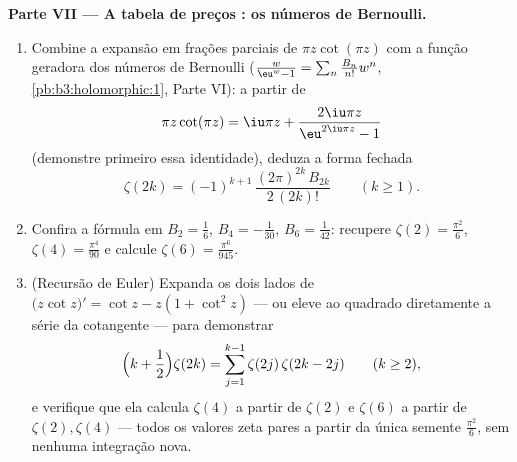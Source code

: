 \begin{problem}
\begin{enumerate}[resume]
\end{enumerate}
\medskip
\noindent\textbf{Parte VII --- A tabela de preços : os números
de Bernoulli.}
\begin{enumerate}[resume]
  \item Combine a expansão em frações parciais de $\pi
        z\cot(\pi z)$ com a função
        geradora dos números de Bernoulli ($\frac{w}{\eu^w - 1} =
        \sum_n\frac{B_n}{n!}w^n$, \cref{pb:b3:holomorphic:1}, Parte
        VI): a partir de
        \[
        \pi z\cot(\pi z) = \iu\pi z +
        \frac{2\iu\pi z}{\eu^{2\iu\pi z} - 1}
        \]
        (demonstre primeiro essa identidade), deduza a forma fechada
        \[
        \zeta(2k) = (-1)^{k+1}\,
        \frac{(2\pi)^{2k}\,B_{2k}}{2\,(2k)!}
        \qquad (k \geq 1).
        \]
  \item Confira a fórmula em $B_2 = \frac16$, $B_4 =
        -\frac1{30}$, $B_6 = \frac1{42}$: recupere $\zeta(2) =
        \frac{\pi^2}6$, $\zeta(4) = \frac{\pi^4}{90}$ e
        calcule $\zeta(6) = \frac{\pi^6}{945}$.
  \item (Recursão de Euler) Expanda os dois lados de $\bigl(z\cot z\bigr)' = \cot z - z(1 + \cot^2z)$ --- ou eleve
        ao quadrado diretamente a série da cotangente --- para
        demonstrar
        \[
        \Bigl(k + \frac12\Bigr)\zeta(2k) =
        \sum_{j=1}^{k-1}\zeta(2j)\,\zeta(2k - 2j)
        \qquad (k \geq 2),
        \]
        e verifique que ela calcula $\zeta(4)$ a partir de $\zeta(2)$ e $\zeta(6)$ a
        partir de $\zeta(2), \zeta(4)$ --- todos os valores zeta pares a partir da
        única semente $\frac{\pi^2}6$, sem nenhuma integração nova.
\end{enumerate}
\end{problem}
